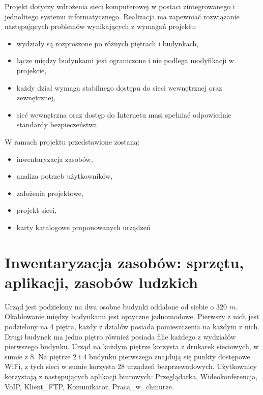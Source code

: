 \documentclass[12pt,a4paper]{article}
\begin{document}
	Projekt dotyczy wdrożenia sieci komputerowej w postaci zintegrowanego i jednolitego systemu informatycznego. Realizacja ma zapewniać rozwiązanie następujących problemów wynikających z wymagań projektu:
	\begin{itemize}
		\item wydziały są rozproszone po różnych piętrach i budynkach,
		\item łącze między budynkami jest ograniczone i nie podlega modyfikacji w projekcie,
		\item każdy dział wymaga stabilnego dostępu do sieci wewnętrznej oraz zewnętrznej,
		\item sieć wewnętrzna oraz dostęp do Internetu musi spełniać odpowiednie standardy bezpieczeństwa
	\end{itemize} 

	\noindent
	W ramach projektu przedstawione zostaną:
	 
	\begin{itemize}
		\item inwentaryzacja zasobów,
		\item analiza potrzeb użytkowników,
		\item założenia projektowe,
		\item projekt sieci,
		\item karty katalogowe proponowanych urządzeń 
	\end{itemize} 
	
	
	\section{Inwentaryzacja zasobów: sprzętu, aplikacji, zasobów ludzkich}
	Urząd jest podzielony na dwa osobne budynki oddalone od siebie o 320 $m$. Okablowanie między budynkami jest optyczne jednomodowe. Pierwszy z nich jest podzielony na 4 piętra, każdy z działów posiada pomieszczenia na każdym z nich. Drugi budynek ma jedno piętro również posiada filie każdego z wydziałów pierwszego budynku. Urząd na każdym piętrze korzysta z drukarek sieciowych, w sumie z 8. Na piętrze 2 i 4 budynku pierwszego znajdują się punkty dostępowe WiFi, z tych sieci w sumie korzysta 28 urządzeń bezprzewodowych. Użytkownicy korzystają z następujących aplikacji biurowych: Przeglądarka, Wideokonferencja, VoIP, Klient\_FTP,	Komunikator, Praca\_w\_chmurze.\\
	
\end{document}
